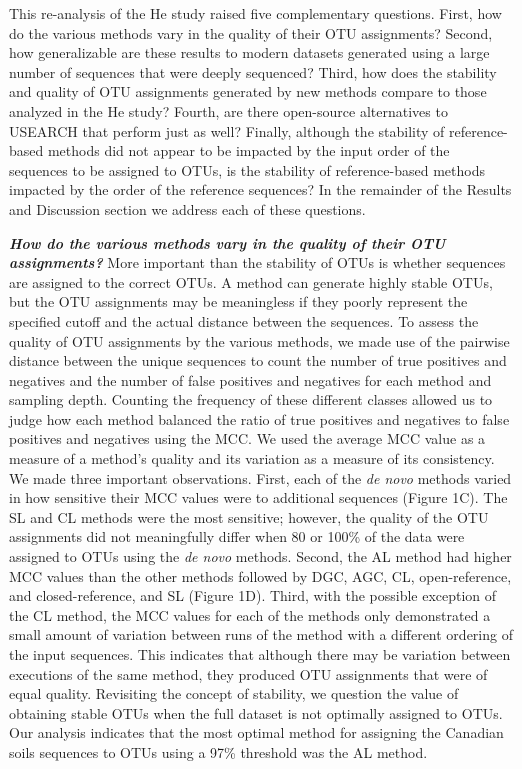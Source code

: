 \documentclass[11pt,]{article}
\begin{document}
This re-analysis of the He study raised five complementary questions.
First, how do the various methods vary in the quality of their OTU
assignments? Second, how generalizable are these results to modern
datasets generated using a large number of sequences that were deeply
sequenced? Third, how does the stability and quality of OTU assignments
generated by new methods compare to those analyzed in the He study?
Fourth, are there open-source alternatives to USEARCH that perform just
as well? Finally, although the stability of reference-based methods did
not appear to be impacted by the input order of the sequences to be
assigned to OTUs, is the stability of reference-based methods impacted
by the order of the reference sequences? In the remainder of the Results
and Discussion section we address each of these questions.

\textbf{\emph{How do the various methods vary in the quality of their
OTU assignments?}} More important than the stability of OTUs is whether
sequences are assigned to the correct OTUs. A method can generate highly
stable OTUs, but the OTU assignments may be meaningless if they poorly
represent the specified cutoff and the actual distance between the
sequences. To assess the quality of OTU assignments by the various
methods, we made use of the pairwise distance between the unique
sequences to count the number of true positives and negatives and the
number of false positives and negatives for each method and sampling
depth. Counting the frequency of these different classes allowed us to
judge how each method balanced the ratio of true positives and negatives
to false positives and negatives using the MCC. We used the average MCC
value as a measure of a method's quality and its variation as a measure
of its consistency. We made three important observations. First, each of
the \emph{de novo} methods varied in how sensitive their MCC values were
to additional sequences (Figure 1C). The SL and CL methods were the most
sensitive; however, the quality of the OTU assignments did not
meaningfully differ when 80 or 100\% of the data were assigned to OTUs
using the \emph{de novo} methods. Second, the AL method had higher MCC
values than the other methods followed by DGC, AGC, CL, open-reference,
and closed-reference, and SL (Figure 1D). Third, with the possible
exception of the CL method, the MCC values for each of the methods only
demonstrated a small amount of variation between runs of the method with
a different ordering of the input sequences. This indicates that
although there may be variation between executions of the same method,
they produced OTU assignments that were of equal quality. Revisiting the
concept of stability, we question the value of obtaining stable OTUs
when the full dataset is not optimally assigned to OTUs. Our analysis
indicates that the most optimal method for assigning the Canadian soils
sequences to OTUs using a 97\% threshold was the AL method.
\end{document}
